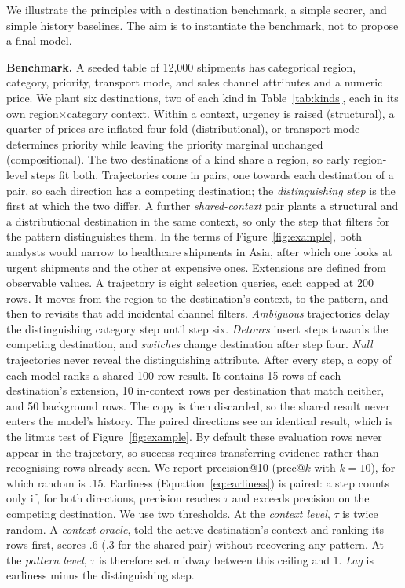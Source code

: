 \documentclass[sigconf]{acmart}
\begin{document}
We illustrate the principles with a destination benchmark, a simple scorer, and simple history baselines. The aim is to instantiate the benchmark, not to propose a final model.

\textbf{Benchmark.}
A seeded table of 12,000 shipments has categorical region, category, priority, transport mode, and sales channel attributes and a numeric price. We plant six destinations, two of each kind in Table~\ref{tab:kinds}, each in its own region$\times$category context. Within a context, urgency is raised (structural), a quarter of prices are inflated four-fold (distributional), or transport mode determines priority while leaving the priority marginal unchanged (compositional). The two destinations of a kind share a region, so early region-level steps fit both. Trajectories come in pairs, one towards each destination of a pair, so each direction has a competing destination; the \emph{distinguishing step} is the first at which the two differ. A further \emph{shared-context} pair plants a structural and a distributional destination in the same context, so only the step that filters for the pattern distinguishes them. In the terms of Figure~\ref{fig:example}, both analysts would narrow to healthcare shipments in Asia, after which one looks at urgent shipments and the other at expensive ones. Extensions are defined from observable values. A trajectory is eight selection queries, each capped at 200 rows. It moves from the region to the destination's context, to the pattern, and then to revisits that add incidental channel filters. \emph{Ambiguous} trajectories delay the distinguishing category step until step six. \emph{Detours} insert steps towards the competing destination, and \emph{switches} change destination after step four. \emph{Null} trajectories never reveal the distinguishing attribute. After every step, a copy of each model ranks a shared 100-row result. It contains 15 rows of each destination's extension, 10 in-context rows per destination that match neither, and 50 background rows. The copy is then discarded, so the shared result never enters the model's history. The paired directions see an identical result, which is the litmus test of Figure~\ref{fig:example}. By default these evaluation rows never appear in the trajectory, so success requires transferring evidence rather than recognising rows already seen. We report precision@10 ($\mathrm{prec@}k$ with $k=10$), for which random is .15. Earliness (Equation~\ref{eq:earliness}) is paired: a step counts only if, for both directions, precision reaches $\tau$ and exceeds precision on the competing destination. We use two thresholds. At the \emph{context level}, $\tau$ is twice random. A \emph{context oracle}, told the active destination's context and ranking its rows first, scores .6 (.3 for the shared pair) without recovering any pattern. At the \emph{pattern level}, $\tau$ is therefore set midway between this ceiling and 1. \emph{Lag} is earliness minus the distinguishing step.
\end{document}
